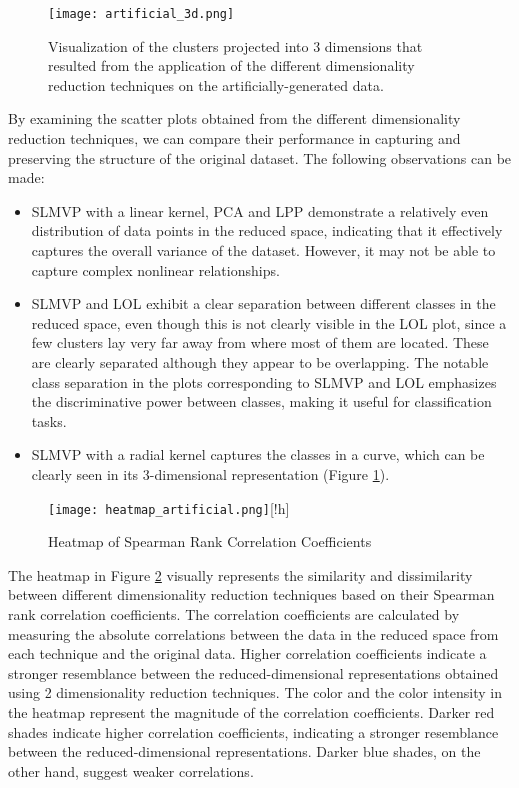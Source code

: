 \begin{figure}[!h]
    \centering
    \texttt{[image: artificial\_3d.png]}
    \caption{Visualization of the clusters projected into 3 dimensions that resulted from the application of the different dimensionality reduction techniques on the artificially-generated data.}
    \label{fig:artificial_3d}
\end{figure}

By examining the scatter plots obtained from the different dimensionality reduction techniques, we can compare their performance in capturing and preserving the structure of the original dataset. The following observations can be made:

\begin{itemize}
    \item SLMVP with a linear kernel, PCA and LPP demonstrate a relatively even distribution of data points in the reduced space, indicating that it effectively captures the overall variance of the dataset. However, it may not be able to capture complex nonlinear relationships.
    \item SLMVP and LOL exhibit a clear separation between different classes in the reduced space, even though this is not clearly visible in the LOL plot, since a few clusters lay very far away from where most of them are located. These are clearly separated although they appear to be overlapping. The notable class separation in the plots corresponding to SLMVP and LOL emphasizes the discriminative power between classes, making it useful for classification tasks.
    \item SLMVP with a radial kernel captures the classes in a curve, which can be clearly seen in its 3-dimensional representation (Figure \ref{fig:artificial_3d}).
\end{itemize}

\begin{center}
    \begin{figure}
        \centering
        \texttt{[image: heatmap\_artificial.png]}[!h]
        \caption{Heatmap of Spearman Rank Correlation Coefficients}
        \label{fig:heatmap-artificial}
    \end{figure}
\end{center}

The heatmap in Figure \ref{fig:heatmap-artificial} visually represents the similarity and dissimilarity between different dimensionality reduction techniques based on their Spearman rank correlation coefficients. The correlation coefficients are calculated by measuring the absolute correlations between the data in the reduced space from each technique and the original data. Higher correlation coefficients indicate a stronger resemblance between the reduced-dimensional representations obtained using 2 dimensionality reduction techniques.
The color and the color intensity in the heatmap represent the magnitude of the correlation coefficients. Darker red shades indicate higher correlation coefficients, indicating a stronger resemblance between the reduced-dimensional representations. Darker blue shades, on the other hand, suggest weaker correlations.

